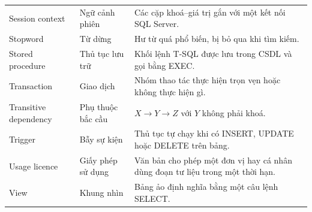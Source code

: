 \begin{longtable}{
    >{\raggedright\arraybackslash}p{}
    >{\raggedright\arraybackslash}p{}
    >{\raggedright\arraybackslash}p{}
}
Session context & Ngữ cảnh phiên & Các cặp khoá--giá trị gắn với một kết nối SQL Server. \\
Stopword & Từ dừng & Hư từ quá phổ biến, bị bỏ qua khi tìm kiếm. \\
Stored procedure & Thủ tục lưu trữ & Khối lệnh T-SQL được lưu trong CSDL và gọi bằng EXEC. \\
Transaction & Giao dịch & Nhóm thao tác thực hiện trọn vẹn hoặc không thực hiện gì. \\
Transitive dependency & Phụ thuộc bắc cầu & $X \rightarrow Y \rightarrow Z$ với $Y$ không phải khoá. \\
Trigger & Bẫy sự kiện & Thủ tục tự chạy khi có INSERT, UPDATE hoặc DELETE trên bảng. \\
Usage licence & Giấy phép sử dụng & Văn bản cho phép một đơn vị hay cá nhân dùng đoạn tư liệu trong một thời hạn. \\
View & Khung nhìn & Bảng ảo định nghĩa bằng một câu lệnh SELECT. \\
\end{longtable}
